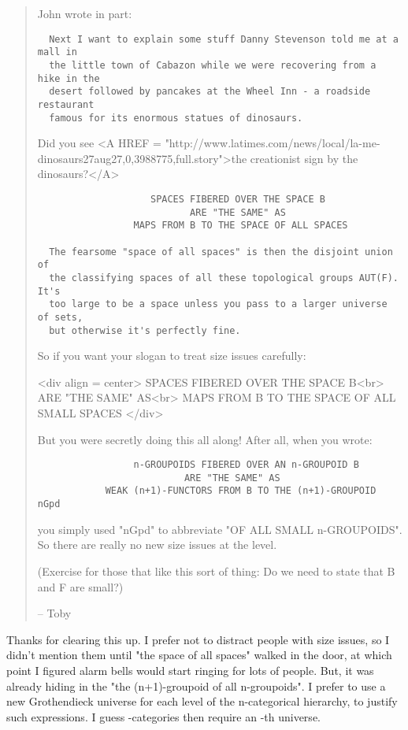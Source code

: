 \begin{quote}
John wrote in part:

\begin{verbatim}
  Next I want to explain some stuff Danny Stevenson told me at a mall in
  the little town of Cabazon while we were recovering from a hike in the
  desert followed by pancakes at the Wheel Inn - a roadside restaurant
  famous for its enormous statues of dinosaurs.
\end{verbatim}
    

Did you see <A HREF = "http://www.latimes.com/news/local/la-me-dinosaurs27aug27,0,3988775,full.story">the creationist sign by the dinosaurs?</A>

\begin{verbatim}
                    SPACES FIBERED OVER THE SPACE B
                           ARE "THE SAME" AS
                 MAPS FROM B TO THE SPACE OF ALL SPACES

  The fearsome "space of all spaces" is then the disjoint union of
  the classifying spaces of all these topological groups AUT(F). It's
  too large to be a space unless you pass to a larger universe of sets,
  but otherwise it's perfectly fine.
\end{verbatim}
    

So if you want your slogan to treat size issues carefully:

<div align = center>
SPACES FIBERED OVER THE SPACE B<br>
  ARE "THE SAME" AS<br>
MAPS FROM B TO THE SPACE OF ALL SMALL SPACES
</div>

But you were secretly doing this all along!
After all, when you wrote:

\begin{verbatim}
                 n-GROUPOIDS FIBERED OVER AN n-GROUPOID B
                          ARE "THE SAME" AS
            WEAK (n+1)-FUNCTORS FROM B TO THE (n+1)-GROUPOID nGpd
\end{verbatim}
    

you simply used "nGpd" to abbreviate "OF ALL 
SMALL n-GROUPOIDS".
So there are really no new size issues at the \omega  level.

(Exercise for those that like this sort of thing:
Do we need to state that B and F are small?)


-- Toby
\end{quote}


Thanks for clearing this up.  I prefer not to distract people with
size issues, so I didn't mention them until "the space of all
spaces" walked in the door, at which point I figured alarm bells 
would start ringing for lots of people.  But, it was already hiding
in the "the (n+1)-groupoid of all n-groupoids".  I prefer to use a
new Grothendieck universe for each level of the n-categorical 
hierarchy, to justify such expressions.  I guess \omega -categories
then require an \omega -th universe. 

